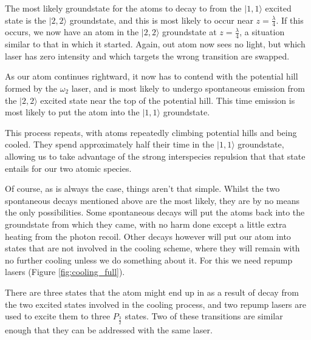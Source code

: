 The most likely groundstate for the atoms to decay to from the $|1,1\rangle$ excited state is the $|2,2\rangle$ groundstate, and this is most likely to occur near $z=\frac\lambda4$. If this occurs, we now have an atom in the $|2,2\rangle$ groundstate at $z=\frac\lambda4$, a situation similar to that in which it started. Again, out atom now sees no light, but which laser has zero intensity and which targets the wrong transition are swapped.

As our atom continues rightward, it now has to contend with the potential hill formed by the $\omega_2$ laser, and is most likely to undergo spontaneous emission from the $|2,2\rangle$ excited state near the top of the potential hill. This time emission is most likely to put the atom into the $|1,1\rangle$ groundstate.

This process repeats, with atoms repeatedly climbing potential hills and being cooled. They spend approximately half their time in the $|1,1\rangle$ groundstate, allowing us to take advantage of the strong interspecies repulsion that that state entails for our two atomic species.

Of course, as is always the case, things aren't that simple. Whilst the two spontaneous decays mentioned above are the most likely, they are by no means the only possibilities. Some spontaneous decays will put the atoms back into the groundstate from which they came, with no harm done except a little extra heating from the photon recoil. Other decays however will put our atom into states that are not involved in the cooling scheme, where they will remain with no further cooling unless we do something about it. For this we need repump lasers (Figure \ref{fig:cooling_full}).

There are three states that the atom might end up in as a result of decay from the two excited states involved in the cooling process, and two repump lasers are used to excite them to three $P_\frac32$ states. Two of these transitions are similar enough that they can be addressed with the same laser.

